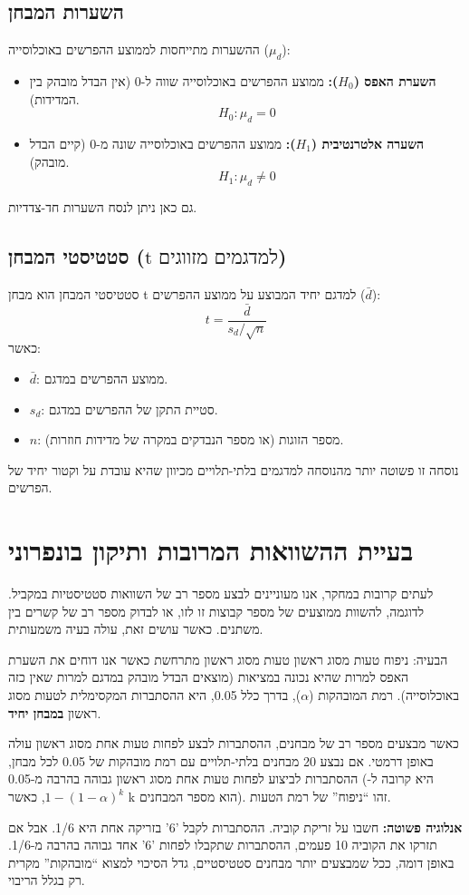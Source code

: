 \documentclass[12pt]{article}
\newcommand{\enquote}[1]{\textquotedblleft #1\textquotedblright}
\begin{document}
\subsection*{השערות המבחן}
ההשערות מתייחסות לממוצע ההפרשים באוכלוסייה (\(\mu_d\)):
\begin{itemize}
    \item \textbf{השערת האפס (\(H_0\)):} ממוצע ההפרשים באוכלוסייה שווה ל-0 (אין הבדל מובהק בין המדידות).
    \[ H_0: \mu_d = 0 \]
    \item \textbf{השערה אלטרנטיבית (\(H_1\)):} ממוצע ההפרשים באוכלוסייה שונה מ-0 (קיים הבדל מובהק).
    \[ H_1: \mu_d \neq 0 \]
\end{itemize}
גם כאן ניתן לנסח השערות חד-צדדיות.

\subsection*{סטטיסטי המבחן (\(\text{t למדגמים מזווגים}\))}
סטטיסטי המבחן הוא מבחן t למדגם יחיד המבוצע על ממוצע ההפרשים (\(\bar{d}\)):
\[ t = \frac{\bar{d}}{s_d / \sqrt{n}} \]
כאשר:
\begin{itemize}
    \item \(\bar{d}\): ממוצע ההפרשים במדגם.
    \item \(s_d\): סטיית התקן של ההפרשים במדגם.
    \item \(n\): מספר הזוגות (או מספר הנבדקים במקרה של מדידות חוזרות).
\end{itemize}
נוסחה זו פשוטה יותר מהנוסחה למדגמים בלתי-תלויים מכיוון שהיא עובדת על וקטור יחיד של הפרשים.

\section{בעיית ההשוואות המרובות ותיקון בונפרוני}
לעתים קרובות במחקר, אנו מעוניינים לבצע מספר רב של השוואות סטטיסטיות במקביל. לדוגמה, להשוות ממוצעים של מספר קבוצות זו לזו, או לבדוק מספר רב של קשרים בין משתנים. כאשר עושים זאת, עולה בעיה משמעותית.

\begin{remarkBox}{הבעיה: ניפוח טעות מסוג ראשון}
טעות מסוג ראשון מתרחשת כאשר אנו דוחים את השערת האפס למרות שהיא נכונה במציאות (מוצאים הבדל מובהק במדגם למרות שאין כזה באוכלוסייה). רמת המובהקות (\(\alpha\)), בדרך כלל 0.05, היא ההסתברות המקסימלית לטעות מסוג ראשון \textbf{במבחן יחיד}.

כאשר מבצעים מספר רב של מבחנים, ההסתברות לבצע לפחות טעות אחת מסוג ראשון עולה באופן דרמטי. אם נבצע 20 מבחנים בלתי-תלויים עם רמת מובהקות של 0.05 לכל מבחן, ההסתברות לביצוע לפחות טעות אחת מסוג ראשון גבוהה בהרבה מ-0.05 (היא קרובה ל-\(1 - (1 - \alpha)^k\), כאשר k הוא מספר המבחנים). זהו \enquote{ניפוח} של רמת הטעות.

\textbf{אנלוגיה פשוטה:} חשבו על זריקת קוביה. ההסתברות לקבל '6' בזריקה אחת היא 1/6. אבל אם תזרקו את הקוביה 10 פעמים, ההסתברות שתקבלו לפחות '6' אחד גבוהה בהרבה מ-1/6. באופן דומה, ככל שמבצעים יותר מבחנים סטטיסטיים, גדל הסיכוי למצוא \enquote{מובהקות} מקרית רק בגלל הריבוי.
\end{remarkBox}
\end{document}
